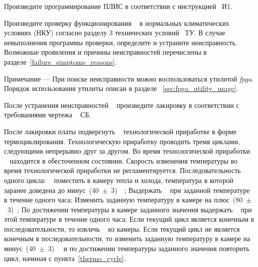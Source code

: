    \subpoint Произведите программирование ПЛИС в соответствии с инструкцией \DocProductSignature~И1.
    
    \subpoint Произведите проверку функционирования \DocProductShortTitle~ в нормальных климатических условиях (НКУ) согласно разделу 3 технических условий \DocModuleSignature~ТУ. 
    \subpoint В случае невыполнения программы проверки, определите и устраните неисправность. 
	      Возможные проявления и причины неисправностей перечислены в разделе~\ref{failure_simptoms_reasons}.
	      
    \begin{footnotesize}    
      Примечание --- При поиске неисправности можно воспользоваться утилитой \emph{fpga}. Порядок использования утилиты описан в разделе ~\ref{sec:fpga_utility_usage}.
    \end{footnotesize}
    
    \subpoint После устранения неисправностей \DocProductShortTitle~ произведите лакировку в соответствии с требованиями чертежа \DocProductSignature~ СБ.

    \subpoint После лакировки платы подвергнуть \DocProductShortTitle~ технологической приработке в форме термоциклирования.
    \subpoint Технологическую приработку проводить тремя циклами, следующими непрерывно друг за другом.
    \subpoint Во время технологической приработки \DocProductShortTitle~ находится в обесточенном состоянии.
    \subpoint Скорость изменения температуры во время технологической приработки \DocProductShortTitle не регламентируется.
    \subpoint Последовательность одного цикла:
      \subsubpoint \DocProductShortTitle~ поместить в камеру тепла и холода, температура в которой заранее доведена до минус~(40~$\pm$~3)~\textcelsius~;
      \subsubpoint Выдержать \DocProductShortTitle~ при заданной температуре в течение одного часа; \label{thermo_cycle}      
      \subsubpoint Изменить заданную температуру в камере на плюс~(80~$\pm$~3)~\textcelsius;
      \subsubpoint По достижении температуры в камере заданного значения выдержать \DocProductShortTitle~ при этой температуре в течение одного часа;
      \subsubpoint Если текущий цикл является конечным в последовательности, то извлечь \DocProductShortTitle~ из камеры.
      \subsubpoint Если текущий цикл не является конечным в последовательности, то изменить заданную температуру в камере на минус~(40~$\pm$~3)~\textcelsius~ 
		    и по достижении температуры заданного значения повторить цикл, начиная с пункта~\ref{thermo_cycle}.
      
